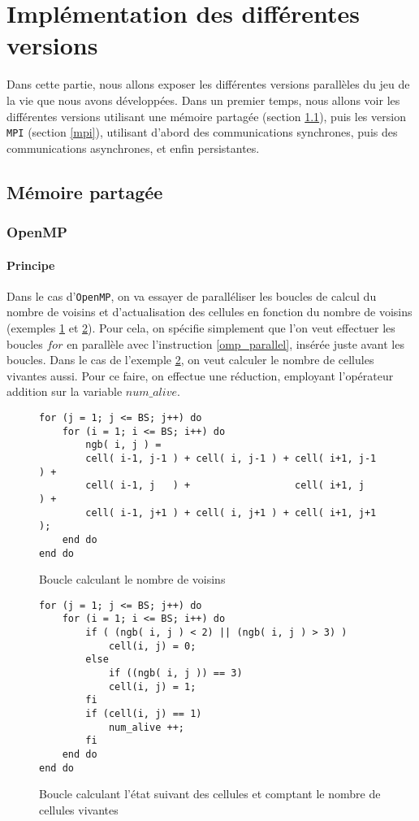 \section{Implémentation des différentes versions} %
\label{sec:diff_rents_versions}
Dans cette partie, nous allons exposer les différentes versions parallèles du jeu de la vie que nous avons développées. Dans un premier temps, nous allons voir les différentes versions utilisant une mémoire partagée (section \ref{partagee}), puis les version \texttt{MPI} (section \ref{mpi}), utilisant d'abord des communications synchrones, puis des communications asynchrones, et enfin persistantes.

\subsection{Mémoire partagée}
\label{partagee}

\subsubsection{OpenMP}
\label{openmp}
\paragraph{Principe}
Dans le cas d'\texttt{OpenMP}, on va essayer de paralléliser les boucles de calcul du nombre de voisins et d'actualisation des cellules en fonction du nombre de voisins (exemples \ref{boucle_voisins} et \ref{boucle_actualisation}). Pour cela, on spécifie simplement que l'on veut effectuer les boucles $for$ en parallèle avec l'instruction \ref{omp_parallel}, insérée juste avant les boucles. Dans le cas de l'exemple \ref{boucle_actualisation}, on veut calculer le nombre de cellules vivantes aussi. Pour ce faire, on effectue une réduction, employant l'opérateur addition sur la variable $num\_alive$. 

\begin{figure}[h!]
\begin{lstlisting}
for (j = 1; j <= BS; j++) do
	for (i = 1; i <= BS; i++) do
		ngb( i, j ) =
		cell( i-1, j-1 ) + cell( i, j-1 ) + cell( i+1, j-1 ) +
		cell( i-1, j   ) +                  cell( i+1, j   ) +
		cell( i-1, j+1 ) + cell( i, j+1 ) + cell( i+1, j+1 );
	end do
end do
\end{lstlisting}
\caption{Boucle calculant le nombre de voisins}
\label{boucle_voisins}
\end{figure}


\begin{figure}[h!]
\begin{lstlisting}
for (j = 1; j <= BS; j++) do
	for (i = 1; i <= BS; i++) do
		if ( (ngb( i, j ) < 2) || (ngb( i, j ) > 3) ) 
			cell(i, j) = 0;
		else 
			if ((ngb( i, j )) == 3)
			cell(i, j) = 1;
		fi
		if (cell(i, j) == 1) 
			num_alive ++;
		fi
	end do
end do
\end{lstlisting}
\caption{Boucle calculant l'état suivant des cellules et comptant le nombre de cellules vivantes}
\label{boucle_actualisation}
\end{figure}

